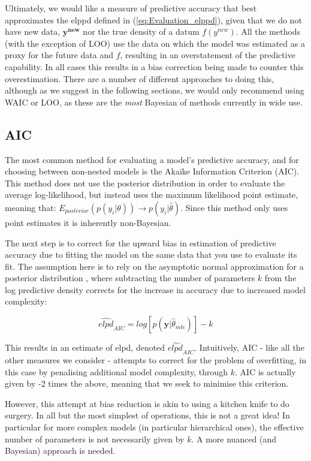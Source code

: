 \documentclass[11pt,fullpage]{book}
\begin{document}
Ultimately, we would like a measure of predictive accuracy that best approximates the elppd defined in (\ref{eq:Evaluation_elppd}), given that we do not have new data, $\boldsymbol{y^{new}}$ nor the true density of a datum $f(y^{new})$. All the methods (with the exception of LOO) use the data on which the model was estimated as a proxy for the future data and $f$, resulting in an overstatement of the predictive capability. In all cases this results in a bias correction being made to counter this overestimation. There are a number of different approaches to doing this, although as we suggest in the following sections, we would only recommend using WAIC or LOO, as these are the \textit{most} Bayesian of methods currently in wide use.

\subsection{AIC}
The most common method for evaluating a model's predictive accuracy, and for choosing between non-nested models is the Akaike Information Criterion (AIC). This method does not use the posterior distribution in order to evaluate the average log-likelihood, but instead uses the maximum likelihood point estimate, meaning that: $E_{posterior}(p(y_i|\theta))\rightarrow p(y_i|\hat{\theta})$. Since this method only uses point estimates it is inherently non-Bayesian.

The next step is to correct for the upward bias in estimation of predictive accuracy due to fitting the model on the same data that you use to evaluate its fit. The assumption here is to rely on the asymptotic normal approximation for a posterior distribution \cite{gelman2013bayesian}, where subtracting the number of parameters $k$ from the log predictive density corrects for the increase in accuracy due to increased model complexity:

\begin{equation}
\widehat{elpd}_{AIC} = log\left[p(\boldsymbol{y}|\hat{\theta}_{mle})\right] - k
\end{equation}

This results in an estimate of elpd, denoted $\widehat{elpd}_{AIC}$. Intuitively, AIC - like all the other measures we consider - attempts to correct for the problem of overfitting, in this case by penalising additional model complexity, through $k$. AIC is actually given by -2 times the above, meaning that we seek to minimise this criterion.

However, this attempt at bias reduction is akin to using a kitchen knife to do surgery. In all but the most simplest of operations, this is not a great idea! In particular for more complex models (in particular hierarchical ones), the effective number of parameters is not necessarily given by $k$. A more nuanced (and Bayesian) approach is needed.
\end{document}
